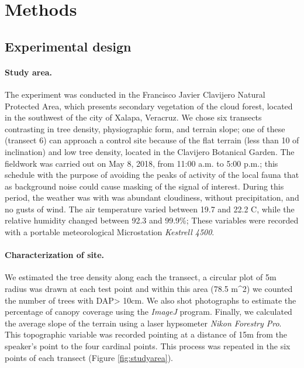 \documentclass[fleqn,10pt,lineno]{wlpeerj} %
\begin{document}
\hypertarget{methods}{%
\section*{Methods}\label{methods}}

\hypertarget{experimental-design}{%
\subsection*{Experimental design}\label{experimental-design}}

\paragraph{Study area.}

The experiment was conducted in the Francisco Javier Clavijero Natural
Protected Area, which presents secondary vegetation of the cloud forest,
located in the southwest of the city of Xalapa, Veracruz. We chose six
transects contrasting in tree density, physiographic form, and terrain
slope; one of these (transect 6) can approach a control site because of
the flat terrain (less than 10 of inclination) and low tree density,
located in the Clavijero Botanical Garden. The fieldwork was carried out
on May 8, 2018, from 11:00 a.m. to 5:00 p.m.; this schedule with the
purpose of avoiding the peaks of activity of the local fauna that as
background noise could cause masking of the signal of interest. During
this period, the weather was with was abundant cloudiness, without
precipitation, and no gusts of wind. The air temperature varied between
19.7 and 22.2 C, while the relative humidity changed between 92.3 and
99.9\%; These variables were recorded with a portable meteorological
Microstation \emph{Kestrell 4500}.

\paragraph{Characterization of site.}

We estimated the tree density along each the transect, a circular plot
of 5m radius was drawn at each test point and within this area (78.5
m\^{}2) we counted the number of trees with DAP\textgreater{} 10cm. We
also shot photographs to estimate the percentage of canopy coverage
using the \emph{ImageJ} program. Finally, we calculated the average
slope of the terrain using a laser hypsometer \emph{Nikon Forestry Pro}.
This topographic variable was recorded pointing at a distance of 15m
from the speaker's point to the four cardinal points. This process was
repeated in the six points of each transect (Figure
\ref{fig:studyarea}).
\end{document}
